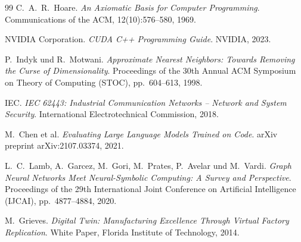 ﻿\documentclass[a4paper,12pt]{article}
\theoremstyle{definition}
\begin{document}
\begin{thebibliography}{99}
C.~A.~R.~Hoare.
\textit{An Axiomatic Basis for Computer Programming}.
Communications of the ACM, 12(10):576--580, 1969.

NVIDIA Corporation.
\textit{CUDA C++ Programming Guide}.
NVIDIA, 2023.

P.~Indyk und R.~Motwani.
\textit{Approximate Nearest Neighbors: Towards Removing the Curse of Dimensionality}.
Proceedings of the 30th Annual ACM Symposium on Theory of Computing (STOC),
pp.~604--613, 1998.

IEC.
\textit{IEC 62443: Industrial Communication Networks -- Network and System Security}.
International Electrotechnical Commission, 2018.

M.~Chen et al.
\textit{Evaluating Large Language Models Trained on Code}.
arXiv preprint arXiv:2107.03374, 2021.

L.~C.~Lamb, A.~Garcez, M.~Gori, M.~Prates, P.~Avelar und M.~Vardi.
\textit{Graph Neural Networks Meet Neural-Symbolic Computing: A Survey and
Perspective}.
Proceedings of the 29th International Joint Conference on Artificial Intelligence
(IJCAI), pp.~4877--4884, 2020.

M.~Grieves.
\textit{Digital Twin: Manufacturing Excellence Through Virtual Factory Replication}.
White Paper, Florida Institute of Technology, 2014.

\end{thebibliography}
\end{document}
